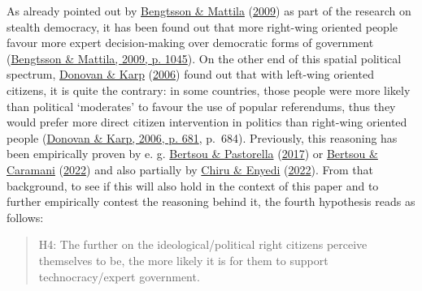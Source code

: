 \documentclass[
  12pt,
  english,
]{article}
\begin{document}
As already pointed out by
\protect\hyperlink{ref-bengtsson2009direct}{Bengtsson \& Mattila}
(\protect\hyperlink{ref-bengtsson2009direct}{2009}) as part of the
research on stealth democracy, it has been found out that more
right-wing oriented people favour more expert decision-making over
democratic forms of government
(\protect\hyperlink{ref-bengtsson2009direct}{Bengtsson \& Mattila, 2009,
p. 1045}). On the other end of this spatial political spectrum,
\protect\hyperlink{ref-donovan2006popular}{Donovan \& Karp}
(\protect\hyperlink{ref-donovan2006popular}{2006}) found out that with
left-wing oriented citizens, it is quite the contrary: in some
countries, those people were more likely than political `moderates' to
favour the use of popular referendums, thus they would prefer more
direct citizen intervention in politics than right-wing oriented people
(\protect\hyperlink{ref-donovan2006popular}{Donovan \& Karp, 2006, p.
681}, p.~684). Previously, this reasoning has been empirically proven by
e. g. \protect\hyperlink{ref-bertsou2017technocratic}{Bertsou \&
Pastorella} (\protect\hyperlink{ref-bertsou2017technocratic}{2017}) or
\protect\hyperlink{ref-bertsou2022people}{Bertsou \& Caramani}
(\protect\hyperlink{ref-bertsou2022people}{2022}) and also partially by
\protect\hyperlink{ref-chiru2022wants}{Chiru \& Enyedi}
(\protect\hyperlink{ref-chiru2022wants}{2022}). From that background, to
see if this will also hold in the context of this paper and to further
empirically contest the reasoning behind it, the fourth hypothesis reads
as follows:

\begin{quote}
H4: The further on the ideological/political right citizens perceive
themselves to be, the more likely it is for them to support
technocracy/expert government.
\end{quote}
\end{document}

